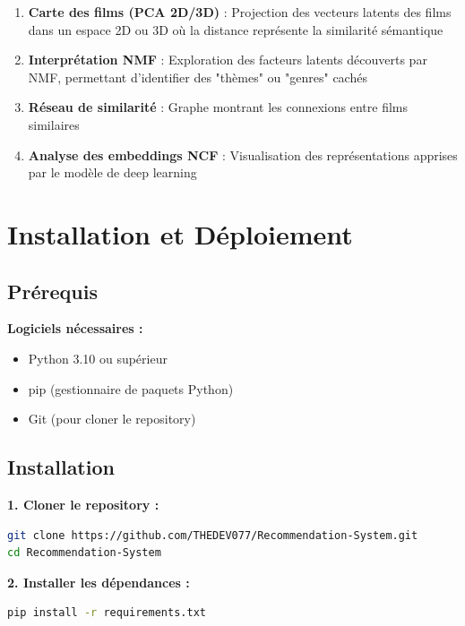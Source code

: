 \documentclass[12pt,a4paper]{article}
\begin{document}
\begin{enumerate}
    \item \textbf{Carte des films (PCA 2D/3D)} : Projection des vecteurs latents des films dans un espace 2D ou 3D où la distance représente la similarité sémantique
    
    \item \textbf{Interprétation NMF} : Exploration des facteurs latents découverts par NMF, permettant d'identifier des "thèmes" ou "genres" cachés
    
    \item \textbf{Réseau de similarité} : Graphe montrant les connexions entre films similaires
    
    \item \textbf{Analyse des embeddings NCF} : Visualisation des représentations apprises par le modèle de deep learning
\end{enumerate}

\section{Installation et Déploiement}

\subsection{Prérequis}

\textbf{Logiciels nécessaires :}
\begin{itemize}
    \item Python 3.10 ou supérieur
    \item pip (gestionnaire de paquets Python)
    \item Git (pour cloner le repository)
\end{itemize}

\subsection{Installation}

\textbf{1. Cloner le repository :}
\begin{lstlisting}[language=bash, caption=Clonage du projet]
git clone https://github.com/THEDEV077/Recommendation-System.git
cd Recommendation-System
\end{lstlisting}

\textbf{2. Installer les dépendances :}
\begin{lstlisting}[language=bash, caption=Installation des paquets]
pip install -r requirements.txt
\end{lstlisting}
\end{document}
